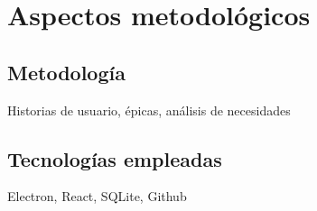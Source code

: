\chapter{Aspectos metodológicos}  

\section{Metodología}

Historias de usuario, épicas, análisis de necesidades

\section{Tecnologías empleadas}

Electron, React, SQLite, Github